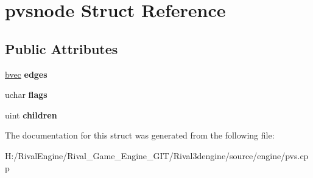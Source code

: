 \hypertarget{structpvsnode}{}\section{pvsnode Struct Reference}
\label{structpvsnode}
\subsection*{Public Attributes}
\begin{DoxyCompactItemize}
\item 
\mbox{\label{structpvsnode_a55f768a0758b5483ae98f46edc36e089}} 
\hyperlink{structbvec}{bvec} {\bfseries edges}
\item 
\mbox{\label{structpvsnode_a281382a5e214adcfff488c5cd95643fc}} 
uchar {\bfseries flags}
\item 
\mbox{\label{structpvsnode_abdb2762fbba27d0a07172b6ce3609c03}} 
uint {\bfseries children}
\end{DoxyCompactItemize}


The documentation for this struct was generated from the following file\+:\begin{DoxyCompactItemize}
\item 
H\+:/\+Rival\+Engine/\+Rival\+\_\+\+Game\+\_\+\+Engine\+\_\+\+G\+I\+T/\+Rival3dengine/source/engine/pvs.\+cpp\end{DoxyCompactItemize}
